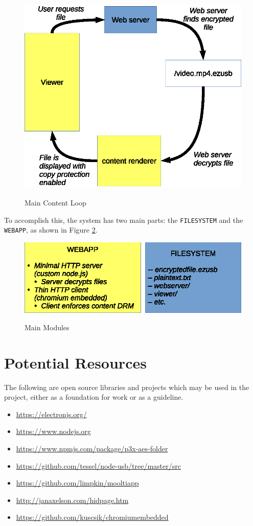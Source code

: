 \documentclass{article}
\begin{document}
\begin{figure}
\centering
\caption{Main Content Loop}
\includegraphics{contentloop.eps}
\label{fig:contentloop}
\end{figure}

To accomplish this, the system has two main parts: the \verb+FILESYSTEM+ 
and the \verb+WEBAPP+, as shown in Figure \ref{fig:mainmods}.

\begin{figure}
\centering
\caption{Main Modules}
\includegraphics{mainmods.eps}
\label{fig:mainmods}
\end{figure}


\section{Potential Resources}
The following are open source libraries and projects which may be used in the
project, either as a foundation for work or as a guideline.
\begin{itemize}
\item \url{https://electronjs.org/}
\item \url{https://www.nodejs.org}
\item \url{https://www.npmjs.com/package/p3x-aes-folder}
\item \url{https://github.com/tessel/node-usb/tree/master/src}
\item \url{https://github.com/limpkin/mooltiapp}
\item \url{http://janaxelson.com/hidpage.htm}
\item \url{https://github.com/kuscsik/chromiumembedded}
\end{itemize}
\end{document}

